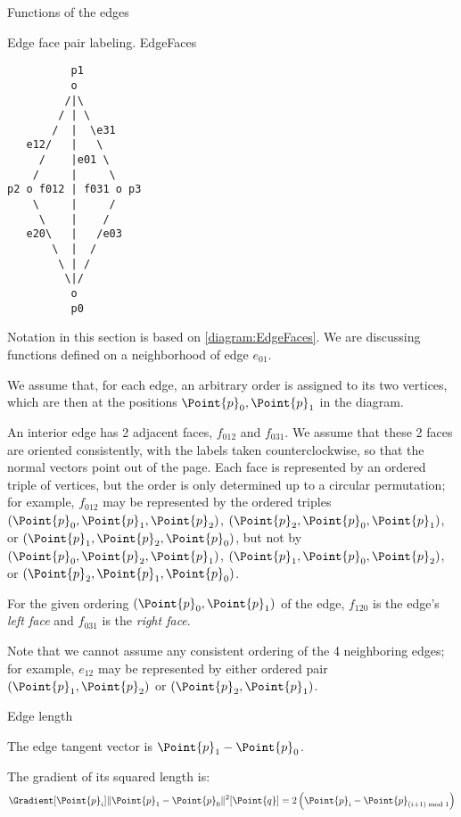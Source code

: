 \begin{plSection}{Functions of the edges}
\label{sec:edges}

\begin{plDiagram}
{Edge face pair labeling.}
{EdgeFaces}
\centering
\begin{verbatim}
          p1
          o
         /|\
        / | \
       /  |  \e31
   e12/   |   \
     /    |e01 \
    /     |     \
p2 o f012 | f031 o p3
    \     |     /
     \    |    /
   e20\   |   /e03
       \  |  /
        \ | /
         \|/
          o
          p0
\end{verbatim}
\end{plDiagram}

Notation in this section is based on \cref{diagram:EdgeFaces}.
We are discussing functions defined on a neighborhood of edge $e_{01}$.

We assume that, for each edge, an arbitrary order is assigned to
its two vertices, which are then at the positions $\Point{p}_0,\Point{p}_1$ in the diagram.

An interior edge has 2 adjacent faces, $f_{012}$ and $f_{031}$.
We assume that these 2 faces are oriented consistently, with the labels
taken counterclockwise, so that the normal vectors point out of the page.
Each face is represented by an ordered triple of vertices,
but the order is only determined up to a circular permutation;
for example, $f_{012}$ may be represented by the ordered triples
$(\Point{p}_0,\Point{p}_1,\Point{p}_2)$, 
$(\Point{p}_2,\Point{p}_0,\Point{p}_1)$, or 
$(\Point{p}_1,\Point{p}_2,\Point{p}_0)$,
but not by
$(\Point{p}_0,\Point{p}_2,\Point{p}_1)$, 
$(\Point{p}_1,\Point{p}_0,\Point{p}_2)$, or
 $(\Point{p}_2,\Point{p}_1,\Point{p}_0)$.

For the given ordering $(\Point{p}_0,\Point{p}_1)$ of the edge,
$f_{120}$ is the edge's {\it left face}
and $f_{031}$ is the {\it right face}.

Note that we cannot assume any consistent ordering of the 4 neighboring edges;
for example, $e_{12}$ may be represented by either ordered pair
$(\Point{p}_1,\Point{p}_2)$ or $(\Point{p}_2,\Point{p}_1)$.

\begin{plSection}{Edge length}
\label{sec:edge_length}

The edge tangent vector is $\Point{p}_1 - \Point{p}_0$.

The gradient of its squared length is:
\begin{equation}
\Gradient[\Point{p}_i]{\| \Point{p}_1 - \Point{p}_0 \|^2}[\Point{q}] 
= 2 \left( \Point{p}_i - \Point{p}_{(i+1) \bmod 1} \right)
\end{equation}


\end{plSection}
\end{plSection}
